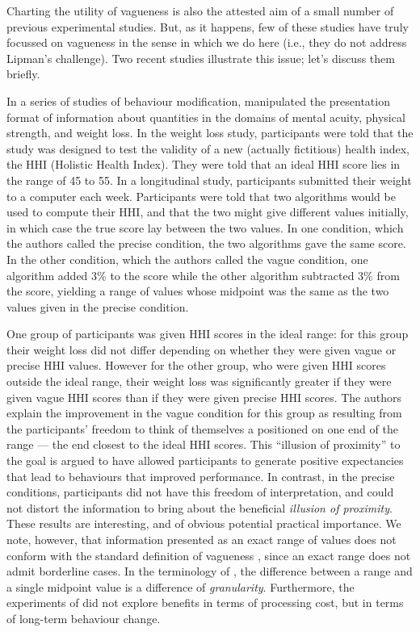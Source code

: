 \documentclass[ %
  graybox       %
 ,envcountchap  %
 ,sectrefs      %
]{svmono}
\begin{document}
Charting the utility of vagueness is also the attested aim of a small number of previous experimental studies. But, as it happens, few of these studies have truly focussed on vagueness in the sense in which we do here (i.e., they do not address Lipman's challenge). Two recent studies illustrate this issue; let's discuss them briefly.

In a series of studies of behaviour modification, \citet{Mishra01042011} manipulated the presentation format of information about quantities in the domains of mental acuity, physical strength, and weight loss. In the weight loss study, participants were told that the study was designed to test the validity of a new (actually fictitious) health index, the HHI (Holistic Health Index). They were told that an ideal HHI score lies in the range of 45 to 55. In a longitudinal study, participants submitted their weight to a computer each week. Participants were told that two algorithms would be used to compute their HHI, and that the two might give different values initially, in which case the true score lay between the two values. In one condition, which the authors called the precise condition, the two algorithms gave the same score. In the other condition, which the authors called the vague condition, one algorithm added 3\% to the score while the other algorithm subtracted 3\% from the score, yielding a range of values whose midpoint was the same as the two values given in the precise condition.

One group of participants was given HHI scores in the ideal range: for this group their weight loss did not differ depending on whether they were given vague or precise HHI values. However for the other group, who were given HHI scores outside the ideal range, their weight loss was significantly greater if they were given vague HHI scores than if they were given precise HHI scores. The authors explain the improvement in the vague condition for this group as resulting from the participants' freedom to think of themselves a positioned on one end of the range --- the end closest to the ideal HHI scores. This ``illusion of proximity'' \citep[][p.~4]{Mishra01042011} to the goal is argued to have allowed participants to generate positive expectancies that lead to behaviours that improved performance. In contrast, in the precise conditions, participants did not have this freedom of interpretation, and could not distort the information to bring about the beneficial \emph{illusion of proximity}. These results are interesting, and of obvious potential practical importance. We note, however, that information presented as an exact range of values does not conform with the standard definition of vagueness \citep{keefe1997vagueness, EgreKlinedinst}, since an exact range does not admit borderline cases. In the terminology of \citeauthor{Hobbs85granularity}, the difference between a range and a single midpoint value is a difference of \emph{granularity}. Furthermore, the experiments of \citeauthor{Mishra01042011} did not explore benefits in terms of processing cost, but in terms of long-term behaviour change.
\end{document}
